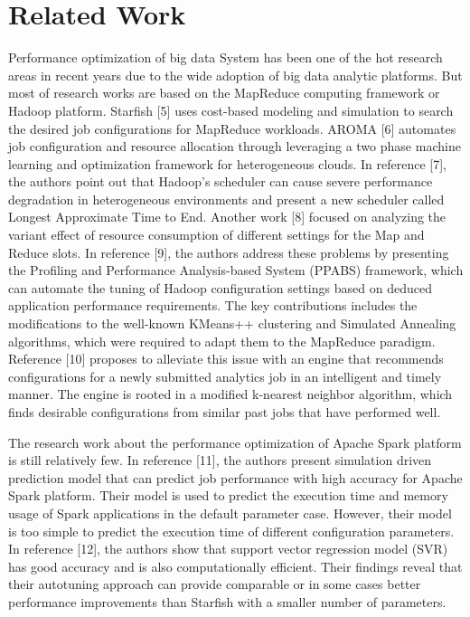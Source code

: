\section{Related Work}
\par Performance optimization of big data System has been one of the hot research areas in recent years due to the wide adoption of big data analytic platforms. But most of research works are based on the MapReduce computing framework or Hadoop platform. Starfish [5] uses cost-based modeling and simulation to search the desired job configurations for MapReduce workloads. AROMA [6] automates job configuration and resource allocation through leveraging a two phase machine learning and optimization framework for heterogeneous clouds. In reference [7], the authors point out that Hadoop's scheduler can cause severe performance
degradation in heterogeneous environments and present a new scheduler called Longest Approximate Time to End. Another work [8] focused on analyzing the variant effect of resource consumption of different settings for the Map and Reduce slots. In reference [9], the authors address these problems by presenting the Profiling and Performance Analysis-based System (PPABS) framework, which can automate the tuning of Hadoop configuration settings based on deduced application performance requirements. The key contributions includes the modifications to the well-known KMeans++ clustering and Simulated Annealing algorithms, which were required to adapt them to the MapReduce paradigm. Reference [10] proposes to alleviate this issue with an engine that recommends configurations for a newly submitted analytics job in an intelligent and timely manner. The engine is rooted in a modified k-nearest neighbor algorithm, which finds desirable configurations from similar past jobs that have performed well.

\par  The research work about the performance optimization of Apache Spark platform is still relatively few. In reference [11], the authors present simulation driven prediction model that can predict job performance with high accuracy for Apache Spark platform. Their model is used to predict the execution time and memory usage of Spark applications in the default parameter case. However, their model is too simple to
predict the execution time of different configuration parameters. In reference [12], the authors show that support vector regression model (SVR) has good accuracy and is also computationally efficient. Their findings reveal that their autotuning approach can provide comparable or in some cases better performance improvements than Starfish with a smaller number of parameters.
